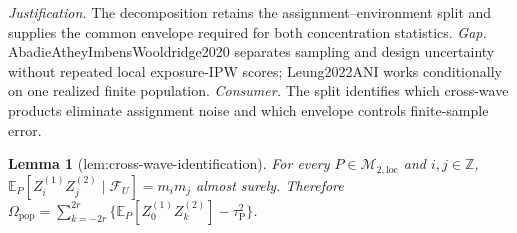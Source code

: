 \documentclass{article}
\newtheorem{lemma}{Lemma}
\begin{document}
\par\smallskip\noindent \textit{Justification.} The decomposition retains the assignment--environment split and supplies the common envelope required for both concentration statistics. \textit{Gap.} AbadieAtheyImbensWooldridge2020 separates sampling and design uncertainty without repeated local exposure-IPW scores; Leung2022ANI works conditionally on one realized finite population. \textit{Consumer.} The split identifies which cross-wave products eliminate assignment noise and which envelope controls finite-sample error.

\begin{lemma}[lem:cross-wave-identification]\label{lem:cross-wave-identification}
For every \(P\in\mathcal M_{2,\mathrm{loc}}\) and \(i,j\in\mathbb Z\), \(\mathbb E_P[Z_i^{(1)}Z_j^{(2)}\mid\mathcal F_U]=m_im_j\) almost surely. Therefore \(\Omega_{\mathrm{pop}}=\sum_{k=-2r}^{2r}\{\mathbb E_P[Z_0^{(1)}Z_k^{(2)}]-\tau_{\mathrm P}^2\}\).
\end{lemma}
\end{document}
